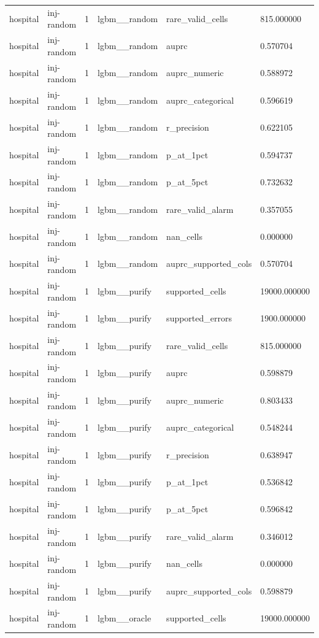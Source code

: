 \begin{tabular}{llllll}
hospital & inj-random & 1 & lgbm\_\_random & rare\_valid\_cells & 815.000000 \\
hospital & inj-random & 1 & lgbm\_\_random & auprc & 0.570704 \\
hospital & inj-random & 1 & lgbm\_\_random & auprc\_numeric & 0.588972 \\
hospital & inj-random & 1 & lgbm\_\_random & auprc\_categorical & 0.596619 \\
hospital & inj-random & 1 & lgbm\_\_random & r\_precision & 0.622105 \\
hospital & inj-random & 1 & lgbm\_\_random & p\_at\_1pct & 0.594737 \\
hospital & inj-random & 1 & lgbm\_\_random & p\_at\_5pct & 0.732632 \\
hospital & inj-random & 1 & lgbm\_\_random & rare\_valid\_alarm & 0.357055 \\
hospital & inj-random & 1 & lgbm\_\_random & nan\_cells & 0.000000 \\
hospital & inj-random & 1 & lgbm\_\_random & auprc\_supported\_cols & 0.570704 \\
hospital & inj-random & 1 & lgbm\_\_purify & supported\_cells & 19000.000000 \\
hospital & inj-random & 1 & lgbm\_\_purify & supported\_errors & 1900.000000 \\
hospital & inj-random & 1 & lgbm\_\_purify & rare\_valid\_cells & 815.000000 \\
hospital & inj-random & 1 & lgbm\_\_purify & auprc & 0.598879 \\
hospital & inj-random & 1 & lgbm\_\_purify & auprc\_numeric & 0.803433 \\
hospital & inj-random & 1 & lgbm\_\_purify & auprc\_categorical & 0.548244 \\
hospital & inj-random & 1 & lgbm\_\_purify & r\_precision & 0.638947 \\
hospital & inj-random & 1 & lgbm\_\_purify & p\_at\_1pct & 0.536842 \\
hospital & inj-random & 1 & lgbm\_\_purify & p\_at\_5pct & 0.596842 \\
hospital & inj-random & 1 & lgbm\_\_purify & rare\_valid\_alarm & 0.346012 \\
hospital & inj-random & 1 & lgbm\_\_purify & nan\_cells & 0.000000 \\
hospital & inj-random & 1 & lgbm\_\_purify & auprc\_supported\_cols & 0.598879 \\
hospital & inj-random & 1 & lgbm\_\_oracle & supported\_cells & 19000.000000 \\

\end{tabular}
